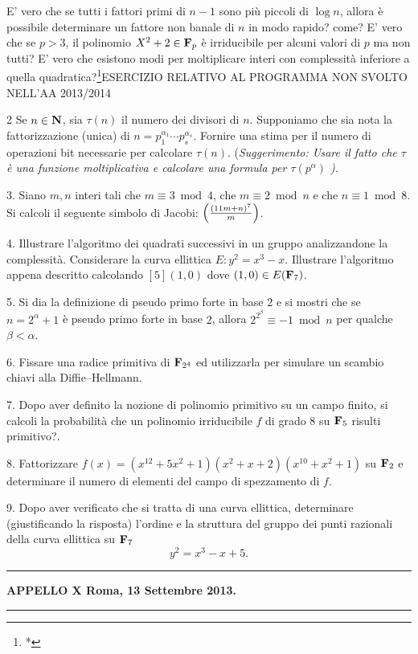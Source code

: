  E' vero che se tutti i fattori primi di $n-1$ sono pi\`u piccoli di $\log n$, allora \`e
possibile determinare un fattore non banale di $n$ in modo rapido? come?
 E' vero che se $p>3$, il polinomio $X^2+2\in{\bf F}_p$ \`e irriducibile per alcuni valori di $p$ ma non tutti?
 E' vero che esistono modi per moltiplicare interi con complessit\`a 
inferiore a quella quadratica?\footnote{*}{ESERCIZIO RELATIVO AL PROGRAMMA NON SVOLTO NELL'AA 2013/2014}
\item{2} Se $n\in{\bf N}$, sia $\tau(n)$ il numero dei divisori di $n$. Supponiamo che sia nota
la fattorizzazione (unica) di $n=p_1^{\alpha_1}\cdots p_s^{\alpha_s}$. Fornire una stima per il
numero di operazioni bit necessarie per calcolare $\tau(n)$. (\it Suggerimento: Usare il
fatto che $\tau$ \`{e} una funzione moltiplicativa e calcolare una formula per $\tau(p^\alpha)$ \rm).
\item{3.} Siano $m,n$ interi tali che $m\equiv3\bmod4$,
che $m\equiv2\bmod n$ e che $n\equiv1\bmod8$. Si calcoli il
seguente simbolo di Jacobi: $\left({(11m+n)^7 \over m}\right)$.
\item{4.}  Illustrare l'algoritmo dei quadrati successivi in un gruppo analizzandone la complessit\`{a}. Considerare
la curva ellittica $E: y^2=x^3-x.$ Illustrare l'algoritmo appena descritto calcolando $[5](1,0)$ dove $(1,0)\in E({\bf F}_{7})$. 
\item{5.}  Si dia la definizione di pseudo primo forte in base $2$ e si mostri che
se $n=2^\alpha+1$ \`{e} pseudo primo forte in base $2$, allora
$2^{2^\beta}\equiv -1\bmod n$ per qualche $\beta<\alpha$.
\item{6.} Fissare una radice primitiva di ${\bf F}_{2^4}$ ed
 utilizzarla per simulare un scambio chiavi alla Diffie--Hellmann.
\item{7.} Dopo aver definito la nozione di polinomio primitivo su un campo finito, si calcoli la probabilit\`{a} che un polinomio
irriducibile $f$ di grado $8$ su ${\bf F}_{5}$ risulti primitivo?.
\item{8.}  Fattorizzare
$f(x)=(x^{12}+5x^{2}+1)(x^2+x+2)(x^{10}+x^2+1)$ su ${\bf
  F}_2$ e determinare il numero di elementi del campo di spezzamento di $f$.
\item{9.}  Dopo aver verificato che si tratta di una curva ellittica, determinare (giustificando la risposta)
l'ordine e la struttura del gruppo dei punti razionali della curva ellittica su
${\bf F}_7$
$$y^2=x^3-x+5.$$
\bigskip
\bigskip\hrule\bigskip
\centerline{{\bf APPELLO X \hfill Roma, 13 Settembre 2013.}}\bigskip\hrule\bigskip

